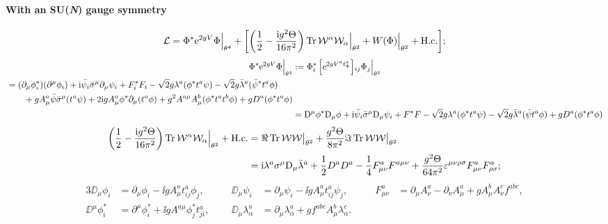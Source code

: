 \documentclass[CheatSheet]{subfiles}
\begin{document}
\newpage

\paragraph{With an SU({\itshape N}) gauge symmetry}
\begin{equation}
   \mathcal L =
\Phi^* {\mathrm{e}}^{2gV}\Phi\Big|_{\theta^4}
+
\biggl[
\left(\frac12 - \frac{{\mathrm{i}} g^2\Theta}{16\pi^2}\right)
\operatorname{\mathrm{Tr}}\mathcal W^\alpha\mathcal W_\alpha\Big|_{\theta^2} +
W(\Phi)\Big|_{\theta^2} + \text{H.c.}
\biggr];
\end{equation}\vskip-18pt
\begin{align}
 \Phi^*{\mathrm{e}}^{2g V}\Phi\Big|_{\theta^4}
&:=\Phi^*_i\left[{\mathrm{e}}^{2g V^a t^a_\Phi}\right]{\!}_{ij}\Phi_j\Big|_{\theta^4}
\\
\begin{split}
 &=
 (\partial_{\mu}\phi_i^*)(\partial^{\mu}\phi_i)+{\mathrm{i}}\bar{\psi_i}\bar\sigma^\mu\partial_{\mu}\psi_i
+F_i^*F_i
 -\sqrt{2}g\lambda^a (\phi^*t^a\psi)
 -\sqrt{2}g\bar\lambda^a(\bar\psi^*t^a\phi)
 \\&\qquad
 + g A^a_{\mu}\bar\psi\bar\sigma^\mu(t^a\psi)
 + 2{\mathrm{i}} gA^a_{\mu}\phi^*\partial_{\mu}(t^a\phi)
 +g^2A^{a\mu}A^b_\mu(\phi^*t^at^b\phi)
 + gD^a(\phi^*t^a\phi)
\end{split}
\\&=
{\mathrm{D}}^\mu\phi^*{\mathrm{D}}_\mu\phi
+{\mathrm{i}}\bar{\psi_i}\bar\sigma^\mu{\mathrm{D}}_{\mu}\psi_i + F^*F
 -\sqrt{2}g\lambda^a (\phi^*t^a\psi)
 -\sqrt{2}g\bar\lambda^a(\bar\psi t^a\phi)
 + gD^a(\phi^*t^a\phi)
\end{align}\vskip-18pt
\begin{equation}
\begin{split}
  \left(\frac12 - \frac{{\mathrm{i}} g^2\Theta}{16\pi^2}\right)\operatorname{\mathrm{Tr}}
 \mathcal W^\alpha\mathcal W_\alpha\Big|_{\theta^2}+\text{H.c.}
 &= \Re\operatorname{\mathrm{Tr}}\mathcal W\mathcal W\big|_{\theta^2}
 + \frac{g^2\Theta}{8\pi^2}\Im\operatorname{\mathrm{Tr}}\mathcal W\mathcal W\big|_{\theta^2}\\
&=
{\mathrm{i}}\lambda^a\sigma^{\mu}{\mathrm{D}}_{\mu}\bar{\lambda}^a
+\frac12D^a D^a
-\frac14F^a_{\mu\nu}F^{a\mu\nu}
+\frac{g^2\Theta}{64\pi^2}\varepsilon^{\mu \nu\rho\sigma}
F^a_{\mu\nu}F^a_{\rho\sigma};
\end{split}
\end{equation}\vskip-18pt
\begin{alignat*}{3}
 \DD_{\mu}\phi_i&=\partial_\mu\phi_i-\ii g A^a_\mu t^a_{ij}\phi_j, \qquad&
  \DD_{\mu}\psi_i&=\partial_\mu\psi_i-\ii g A^a_\mu t^a_{ij}\psi_j, \qquad&
  F^a_{\mu\nu}&=\partial_{\mu}A_\nu^a-\partial_{\nu}A_\mu^a+g A_\mu^b A_\nu^c f^{abc},\\
\DD^{\mu}\phi_i^*&=\partial^\mu\phi_i^*+\ii g A^{a\mu}\phi_j^*t^a_{ji},&
\DD_\mu\lambda^a_\alpha&=\partial_{\mu}\lambda^{a}_\alpha+g f^{abc}A_\mu^{b}\lambda^{c}_\alpha.
\end{alignat*}
\end{document}
